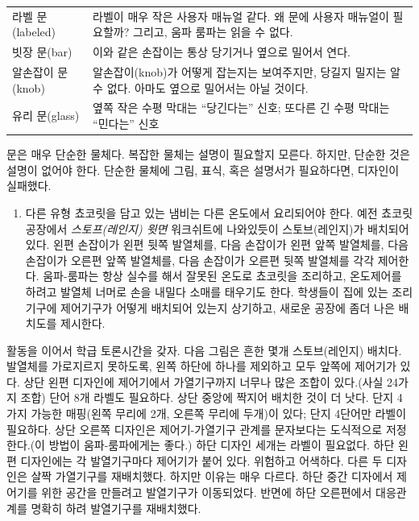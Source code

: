 \documentclass[]{article}
\begin{document}
\begin{longtable}[c]{@{}ll@{}}
\toprule
라벨 문(labeled) & 라벨이 매우 작은 사용자 매뉴얼 같다. 왜 문에 사용자
매뉴얼이 필요할까? 그리고, 움파 룸파는 읽을 수 없다.\tabularnewline
빗장 문(bar) & 이와 같은 손잡이는 통상 당기거나 옆으로 밀어서
연다.\tabularnewline
알손잡이 문(knob) & 알손잡이(knob)가 어떻게 잡는지는 보여주지만, 당길지
밀지는 알수 없다. 아마도 옆으로 밀어서는 아닐 것이다.\tabularnewline
유리 문(glass) & 옆쪽 작은 수평 막대는 ``당긴다는'' 신호; 또다른 긴 수평
막대는 ``민다는'' 신호\tabularnewline
\bottomrule
\end{longtable}

문은 매우 단순한 물체다. 복잡한 물체는 설명이 필요할지 모른다. 하지만,
단순한 것은 설명이 없어야 한다. 단순한 물체에 그림, 표식, 혹은 설명서가
필요하다면, 디자인이 실패했다.

\begin{enumerate}
\itemsep1pt\parskip0pt
\item
  다른 유형 쵸코릿을 담고 있는 냄비는 다른 온도에서 요리되어야 한다.
  예전 쵸코릿 공장에서 \emph{스토프(레인지) 윗면} 워크쉬트에 나와있듯이
  스토브(레인지)가 배치되어 있다. 왼편 손잡이가 왼편 뒷쪽 발열체를, 다음
  손잡이가 왼편 앞쪽 발열체를, 다음 손잡이가 오른편 앞쪽 발열체를, 다음
  손잡이가 오른편 뒷쪽 발열체를 각각 제어한다. 움파-룸파는 항상 실수를
  해서 잘못된 온도로 쵸코릿을 조리하고, 온도제어를 하려고 발열체 너머로
  손을 내밀다 소매를 태우기도 한다. 학생들이 집에 있는 조리기구에
  제어기구가 어떻게 배치되어 있는지 상기하고, 새로운 공장에 좀더 나은
  배치도를 제시한다.
\end{enumerate}

활동을 이어서 학급 토론시간을 갖자. 다음 그림은 흔한 몇개 스토브(레인지)
배치다. 발열체를 가로지르지 못하도록, 왼쪽 하단에 하나를 제외하고 모두
앞쪽에 제어기가 있다. 상단 왼편 디자인에 제어기에서 가열기구까지 너무나
많은 조합이 있다.(사실 24가지 조합) 단어 8개 라벨도 필요하다. 상단
중앙에 짝지어 배치한 것이 더 낫다. 단지 4가지 가능한 매핑(왼쪽 무리에
2개, 오른쪽 무리에 두개)이 있다; 단지 4단어만 라벨이 필요하다. 상단
오른쪽 디자인은 제어기-가열기구 관계를 문자보다는 도식적으로
저정한다.(이 방법이 움파-룸파에게는 좋다.) 하단 디자인 세개는 라벨이
필요없다. 하단 왼편 디자인에는 각 발열기구마다 제어기가 붙어 있다.
위험하고 어색하다. 다른 두 디자인은 살짝 가열기구를 재배치했다. 하지만
이유는 매우 다르다. 하단 중간 디자에서 제어기를 위한 공간을 만들려고
발열기구가 이동되었다. 반면에 하단 오른편에서 대응관계를 명확히 하려
발열기구를 재배치했다.
\end{document}
